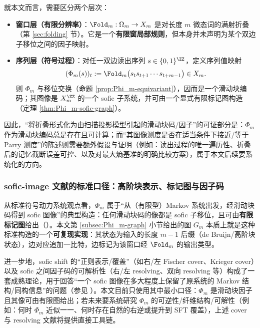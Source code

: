 就本文而言，需要区分两个层次：
\begin{itemize}
  \item \textbf{窗口层（有限分辨率）}：$\Fold_m:\Omega_m\to X_m$ 是对长度 $m$ 微态词的满射折叠（第 \ref{sec:folding} 节）。它是一个\textbf{有限窗局部规则}，但本身并未声明为某个双边子移位之间的因子映射。
  \item \textbf{序列层（符号过程）}：对任一双边读出序列 $s\in\{0,1\}^{\ZZ}$，定义序列值映射
  \[
  (\Phi_m(s))_t:=\Fold_m\bigl(s_t s_{t+1}\cdots s_{t+m-1}\bigr)\in X_m.
  \]
  则 $\Phi_m$ 与移位交换（命题 \ref{prop:Phi_m-equivariant}），因而是一个滑动块编码；其图像是 $X_m^{\ZZ}$ 的一个 sofic 子系统，并可由一个显式有限标记图构造（定理 \ref{thm:Phi_m-sofic-graph}）。
\end{itemize}

因此，“将折叠形式化为由扫描投影模型引起的滑动块码/因子”的可证部分是：$\Phi_m$ 作为滑动块编码总是存在且可计算；而“其图像测度是否在适当条件下接近/等于 Parry 测度”的陈述则需要额外假设与证明（例如：读出过程的唯一遍历性、折叠后的记忆截断误差可控、以及对最大熵基准的明确比较方案），属于本文后续要系统化的方向。

\subsubsection{sofic-image 文献的标准口径：高阶块表示、标记图与因子码}
从标准符号动力系统观点看，\(\Phi_m\) 属于“从（有限型）Markov 系统出发，经滑动块码得到 sofic 图像”的典型构造：任何滑动块码的像都是 sofic 子移位，且可由\textbf{有限标记图}给出（\cite{LindMarcus1995,Kitchens1998SymbolicDynamics}）。本文第 \ref{subsec:Phi_m-graph} 小节给出的图 \(G_m\) 本质上就是这种标准构造的一个\textbf{可复现实现}：其状态为输入的长度 \(m\!-\!1\) 后缀（de Bruijn/高阶块状态），边对应追加一比特，边标记为该窗口经 \(\Fold_m\) 的输出类型。

进一步地，sofic shift 的“正则表示/覆盖”（如右/左 Fischer cover、Krieger cover）以及 sofic 之间因子码的可解析性（右/左 resolving、双向 resolving 等）构成了一套成熟理论，用于回答“一个 sofic 图像在多大程度上保留了原系统的 Markov 结构/同构信息”的问题（参见 \cite{LindMarcus1995,Nasu1995TextileSystems}）。本文目前只使用其中最小口径：\(\Phi_m\) 是滑动块因子且其像可由有限图给出；若未来要系统研究 \(\Phi_m\) 的可逆性/纤维结构/可解性（例如：何时 \(\Phi_m\) 近似一一、何时存在自然的右逆或提升到 SFT 覆盖），上述 cover 与 resolving 文献将提供直接工具链。

